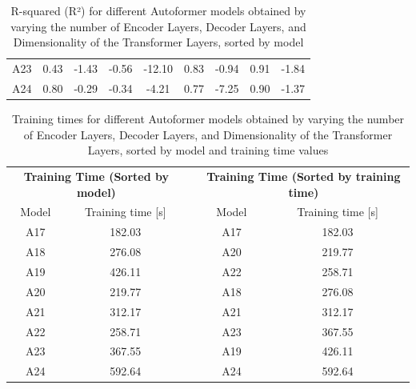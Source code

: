 \begin{table}[]
{\begin{tabular}{ccccccccc}
    A23   & \cellcolor[HTML]{FEE082}0.43  & \cellcolor[HTML]{FDC67C}-1.43 & \cellcolor[HTML]{F8696B}-0.56 & \cellcolor[HTML]{FCB379}-12.10 & \cellcolor[HTML]{63BE7B}0.83  & \cellcolor[HTML]{E5E483}-0.94 & \cellcolor[HTML]{63BE7B}0.91 & \cellcolor[HTML]{FCBE7B}-1.84 \\
    A24   & \cellcolor[HTML]{84C87D}0.80  & \cellcolor[HTML]{63BE7B}-0.29 & \cellcolor[HTML]{FEE883}-0.34 & \cellcolor[HTML]{63BE7B}-4.21  & \cellcolor[HTML]{92CC7E}0.77  & \cellcolor[HTML]{F8696B}-7.25 & \cellcolor[HTML]{71C37C}0.90 & \cellcolor[HTML]{FEEA83}-1.37
    \end{tabular}%
    }
    \caption{R-squared (R²) for different Autoformer models obtained by varying the number of Encoder Layers, Decoder Layers, and Dimensionality of the Transformer Layers, sorted by model}
    \label{A4_R}
    \end{table}


    

\begin{table}[]
    \begin{tabular}{ccccc}
    \multicolumn{2}{c}{\textbf{Training   Time (Sorted by model)}} &  & \multicolumn{2}{c}{\textbf{Training Time (Sorted   by training time)}} \\
    Model             & Training time {[}s{]}                      &  & Model                 & Training time {[}s{]}                          \\
    A17               & \cellcolor[HTML]{63BE7B}182.03             &  & A17                   & \cellcolor[HTML]{63BE7B}182.03                 \\
    A18               & \cellcolor[HTML]{E5E382}276.08             &  & A20                   & \cellcolor[HTML]{97CD7E}219.77                 \\
    A19               & \cellcolor[HTML]{FCB279}426.11             &  & A22                   & \cellcolor[HTML]{CDDC81}258.71                 \\
    A20               & \cellcolor[HTML]{97CD7E}219.77             &  & A18                   & \cellcolor[HTML]{E5E382}276.08                 \\
    A21               & \cellcolor[HTML]{FFE483}312.17             &  & A21                   & \cellcolor[HTML]{FFE483}312.17                 \\
    A22               & \cellcolor[HTML]{CDDC81}258.71             &  & A23                   & \cellcolor[HTML]{FECC7E}367.55                 \\
    A23               & \cellcolor[HTML]{FECC7E}367.55             &  & A19                   & \cellcolor[HTML]{FCB279}426.11                 \\
    A24               & \cellcolor[HTML]{F8696B}592.64             &  & A24                   & \cellcolor[HTML]{F8696B}592.64                
    \end{tabular}
    \caption{Training times for different Autoformer models obtained by varying the number of Encoder Layers, Decoder Layers, and Dimensionality of the Transformer Layers, sorted by model and training time values}
    \label{A4_T}
    \end{table}

